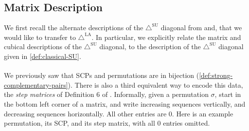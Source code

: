 \documentclass{amsart}
\theoremstyle{definition}
\newcommand{\SUD}{\triangle^{\mathrm{SU}}}
\newcommand{\LAD}{\triangle^{\mathrm{LA}}}
\begin{document}

\subsection{Matrix Description}


We first recall the alternate descriptions of the $\SUD$ diagonal from \cite{SaneblidzeUmble04} and\cite{saneblidzeComparingDiagonalsAssociahedra2022}, that we would like to transfer to $\LAD$. 
In particular, we explicitly relate the matrix and cubical descriptions of the $\SUD$ diagonal, to the description of the $\SUD$ diagonal given in \cref{def:classical-SU}.
\\\\
We previously saw that SCPs and permutations are in bijection (\cref{def:strong-complementary-pairs}). 
There is also a third equivalent way to encode this data, the \emph{step matrices} of Definition 6 of \cite{SaneblidzeUmble04}.
Informally, given a permutation $\sigma$, start in the bottom left corner of a matrix, and write increasing sequences vertically, and decreasing sequences horizontally. All other entries are $0$. Here is an example permutation, its SCP, and its step matrix, with all $0$ entries omitted.
{\small
\begin{center}
$\quad \quad$
$\quad \quad$
\end{center}
}
\end{document}
